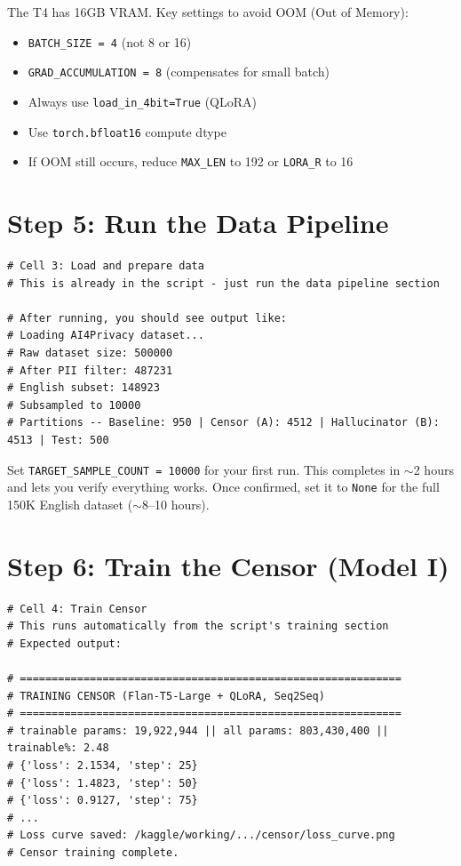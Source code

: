 \documentclass[11pt, a4paper]{article}
\begin{document}
\begin{important}
The T4 has 16GB VRAM. Key settings to avoid OOM (Out of Memory):
\begin{itemize}[nosep]
    \item \texttt{BATCH\_SIZE = 4} (not 8 or 16)
    \item \texttt{GRAD\_ACCUMULATION = 8} (compensates for small batch)
    \item Always use \texttt{load\_in\_4bit=True} (QLoRA)
    \item Use \texttt{torch.bfloat16} compute dtype
    \item If OOM still occurs, reduce \texttt{MAX\_LEN} to 192 or \texttt{LORA\_R} to 16
\end{itemize}
\end{important}

\section{Step 5: Run the Data Pipeline}

\begin{lstlisting}[style=python]
# Cell 3: Load and prepare data
# This is already in the script - just run the data pipeline section

# After running, you should see output like:
# Loading AI4Privacy dataset...
# Raw dataset size: 500000
# After PII filter: 487231
# English subset: 148923
# Subsampled to 10000
# Partitions -- Baseline: 950 | Censor (A): 4512 | Hallucinator (B): 4513 | Test: 500
\end{lstlisting}

\begin{tip}
Set \texttt{TARGET\_SAMPLE\_COUNT = 10000} for your first run. This completes in $\sim$2 hours and lets you verify everything works. Once confirmed, set it to \texttt{None} for the full 150K English dataset ($\sim$8--10 hours).
\end{tip}

\section{Step 6: Train the Censor (Model I)}

\begin{lstlisting}[style=python]
# Cell 4: Train Censor
# This runs automatically from the script's training section
# Expected output:

# ============================================================
# TRAINING CENSOR (Flan-T5-Large + QLoRA, Seq2Seq)
# ============================================================
# trainable params: 19,922,944 || all params: 803,430,400 || trainable%: 2.48
# {'loss': 2.1534, 'step': 25}
# {'loss': 1.4823, 'step': 50}
# {'loss': 0.9127, 'step': 75}
# ...
# Loss curve saved: /kaggle/working/.../censor/loss_curve.png
# Censor training complete.
\end{lstlisting}
\end{document}
